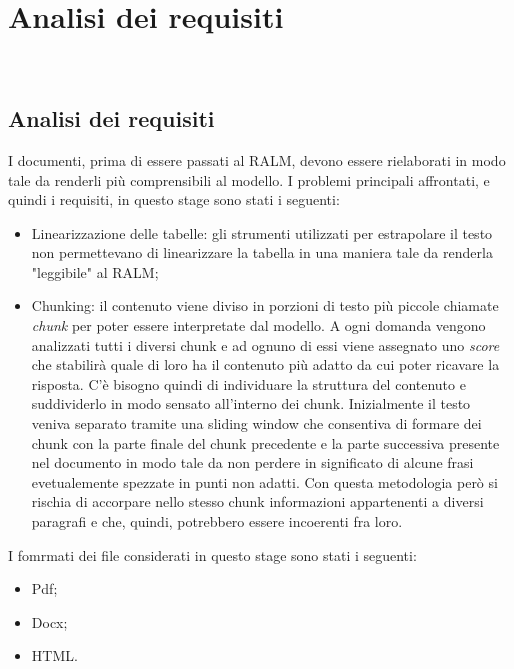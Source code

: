 \chapter{Analisi dei requisiti}
\label{cap:analisi preliminare}

 \\

\section{Analisi dei requisiti}
I documenti, prima di essere passati al RALM, devono essere rielaborati in modo tale da renderli più comprensibili al modello.
I problemi principali affrontati, e quindi i requisiti, in questo stage sono stati i seguenti:
\begin{itemize}
    \item Linearizzazione delle tabelle: gli strumenti utilizzati per estrapolare il testo non permettevano di linearizzare 
    la tabella in una maniera tale da renderla "leggibile" al RALM;
    \item Chunking: il contenuto viene diviso in porzioni di testo più piccole chiamate \emph{chunk} per poter essere interpretate dal modello. A ogni domanda vengono analizzati tutti i 
    diversi chunk e ad ognuno di essi viene assegnato uno \emph{score} che stabilirà quale di loro ha il contenuto più adatto da cui poter ricavare la risposta. 
    \noindent C'è bisogno quindi di individuare la struttura del contenuto e suddividerlo in modo sensato all'interno dei chunk.
    Inizialmente il testo veniva separato tramite una sliding window che consentiva di formare dei chunk con la parte finale del chunk precedente e la parte successiva presente nel documento in modo tale da non perdere in significato di alcune frasi evetualemente spezzate in punti non adatti.
    \noindent Con questa metodologia però si rischia di accorpare nello stesso chunk informazioni appartenenti a diversi paragrafi e che, quindi, potrebbero essere incoerenti fra loro.
\end{itemize}

I fomrmati dei file considerati in questo stage sono stati i seguenti:
\begin{itemize}
    \item Pdf;
    \item Docx;
    \item HTML.
\end{itemize}

